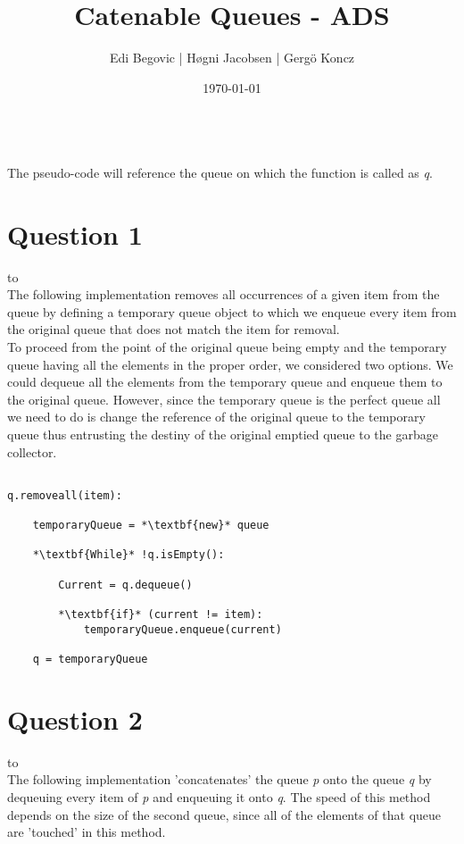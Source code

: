 \documentclass[a4paper]{article}
\title{Catenable Queues - ADS}
\author{Edi Begovic | Høgni Jacobsen | Gergö Koncz}
\date{\today}
\def\headline#1{\hbox to \hsize{\hrulefill\quad\lower.3em\hbox{#1}\quad\hrulefill}}
\begin{document}
 
\maketitle

\ \\
\noindent
The pseudo-code will reference the queue on which the function is called as \textit{q}.
\ \\
\section*{Question 1}
\headline{-} \ \\

\noindent
The following implementation removes all occurrences of a given item from the queue by defining a temporary queue
object to which we enqueue every item from the original queue that does not match the item for removal. 
\ \\

\noindent
To proceed from the point of the original queue being empty and the temporary queue having all the elements in the proper order, we considered two options. We could dequeue all the elements from the temporary queue and enqueue them to the original queue. However, since the temporary queue is the perfect queue all we need to do is change the reference of the original queue to the temporary queue thus entrusting the destiny of the original emptied queue to the garbage collector. 

\noindent
\begin{lstlisting}[escapeinside={{*}{*}}]

q.removeall(item):

    temporaryQueue = *\textbf{new}* queue

    *\textbf{While}* !q.isEmpty():

        Current = q.dequeue()
        
        *\textbf{if}* (current != item):
            temporaryQueue.enqueue(current) 
    
    q = temporaryQueue

\end{lstlisting}

\newpage
\section*{Question 2}
\headline{-} \ \\
The following implementation 'concatenates' the queue \textit{p} onto the queue \textit{q} by
dequeuing every item of \textit{p} and enqueuing it onto \textit{q}. The speed of this method depends on the size of the second queue, since all of the elements of that queue are 'touched' in this method.
\ \\
\end{document}
